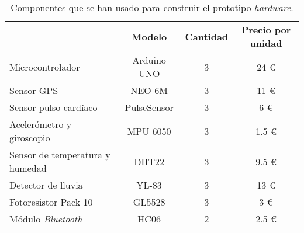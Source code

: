 \begin{table}[!h]
\centering
\begin{tabular}{@{}lccc@{}}
\rowcolor[HTML]{C0C0C0} 
\multicolumn{1}{c}{\cellcolor[HTML]{C0C0C0}{\color[HTML]{000000} \textbf{Componente}}} & {\color[HTML]{000000} \textbf{Modelo}} & {\color[HTML]{000000} \textbf{Cantidad}} & {\color[HTML]{000000} \textbf{Precio por unidad}} \\ 
\rowcolor[HTML]{EFEFEF} 
Microcontrolador                                                                         & Arduino UNO                            & 3                                        & 24 \euro                                               \\ 
Sensor GPS                                                                               & NEO-6M                                 & 3                                        & 11 \euro                                               \\ 
\rowcolor[HTML]{EFEFEF} 
Sensor pulso cardíaco                                                                    & PulseSensor                            & 3                                        & 6 \euro                                                \\ 
Acelerómetro y giroscopio                                                                & MPU-6050                               & 3                                        & 1.5 \euro                                              \\ 
\rowcolor[HTML]{EFEFEF} 
Sensor de temperatura y humedad                                                          & DHT22                                  & 3                                        & 9.5 \euro                                              \\ 
Detector de lluvia                                                                       & YL-83                                  & 3                                        & 13 \euro                                               \\ 
\rowcolor[HTML]{EFEFEF} 
Fotoresistor Pack 10                                                                     & GL5528                                 & 3                                        & 3 \euro                                                \\ 
Módulo \textit{Bluetooth}                                                                         & HC06                                   & 2                                        & 2.5 \euro                                              \\ 
\end{tabular}
\caption{Componentes que se han usado para construir el prototipo \textit{hardware}.}
\label{table:componentes}
\end{table}

